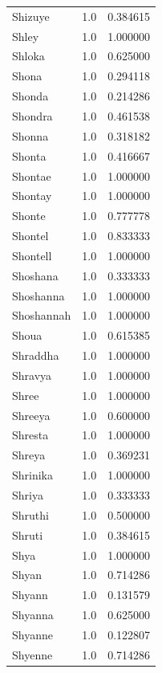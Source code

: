 \documentclass[
  letterpaper,
  DIV=11,
  numbers=noendperiod]{scrreprt}
\begin{document}
\begin{tabular}{lrr}
Shizuye         &   1.0 &   0.384615 \\
Shley           &   1.0 &   1.000000 \\
Shloka          &   1.0 &   0.625000 \\
Shona           &   1.0 &   0.294118 \\
Shonda          &   1.0 &   0.214286 \\
Shondra         &   1.0 &   0.461538 \\
Shonna          &   1.0 &   0.318182 \\
Shonta          &   1.0 &   0.416667 \\
Shontae         &   1.0 &   1.000000 \\
Shontay         &   1.0 &   1.000000 \\
Shonte          &   1.0 &   0.777778 \\
Shontel         &   1.0 &   0.833333 \\
Shontell        &   1.0 &   1.000000 \\
Shoshana        &   1.0 &   0.333333 \\
Shoshanna       &   1.0 &   1.000000 \\
Shoshannah      &   1.0 &   1.000000 \\
Shoua           &   1.0 &   0.615385 \\
Shraddha        &   1.0 &   1.000000 \\
Shravya         &   1.0 &   1.000000 \\
Shree           &   1.0 &   1.000000 \\
Shreeya         &   1.0 &   0.600000 \\
Shresta         &   1.0 &   1.000000 \\
Shreya          &   1.0 &   0.369231 \\
Shrinika        &   1.0 &   1.000000 \\
Shriya          &   1.0 &   0.333333 \\
Shruthi         &   1.0 &   0.500000 \\
Shruti          &   1.0 &   0.384615 \\
Shya            &   1.0 &   1.000000 \\
Shyan           &   1.0 &   0.714286 \\
Shyann          &   1.0 &   0.131579 \\
Shyanna         &   1.0 &   0.625000 \\
Shyanne         &   1.0 &   0.122807 \\
Shyenne         &   1.0 &   0.714286 \\

\end{tabular}
\end{document}
